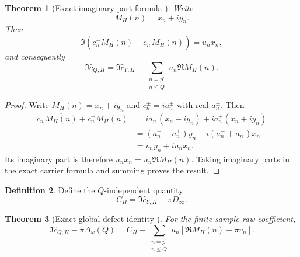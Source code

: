 \documentclass[11pt]{amsart}
\numberwithin{equation}{section}
\theoremstyle{plain}
\newtheorem{theorem}{Theorem}[section]
\theoremstyle{definition}
\newtheorem{definition}[theorem]{Definition}
\theoremstyle{remark}
\newcommand{\1}{\mathbf{1}}
\begin{document}
\begin{theorem}[Exact imaginary-part formula {}]
\label{thm:imaginary_part_identity}
Write
\begin{equation}
M_H(n)=x_n+iy_n.
\label{eq:abstract_MH_xy}
\end{equation}
Then
\begin{equation}
\Im\left(c_n^-\overline{M_H(n)}+c_n^+M_H(n)\right)
=u_nx_n,
\label{eq:abstract_mode_imaginary_projection}
\end{equation}
and consequently
\begin{equation}
\boxed{
\Im\widehat c_{Q,H}
=
\Im\widehat c_{Y,H}
-
\sum_{\substack{n=p^r\\n\leq Q}}
u_n\Re M_H(n).
}
\label{eq:abstract_imaginary_part_identity}
\end{equation}
\end{theorem}

\begin{proof}
Write \(M_H(n)=x_n+iy_n\) and \(c_n^\pm=ia_n^\pm\) with real
\(a_n^\pm\).  Then
\begin{align}
c_n^-\overline{M_H(n)}+c_n^+M_H(n)
&=
ia_n^-(x_n-iy_n)+ia_n^+(x_n+iy_n)
\label{eq:imaginary_identity_expand_one}
\\
&=
(a_n^--a_n^+)y_n
+i(a_n^-+a_n^+)x_n
\label{eq:imaginary_identity_expand_two}
\\
&=
v_ny_n+iu_nx_n.
\label{eq:imaginary_identity_expand_three}
\end{align}
Its imaginary part is therefore \(u_nx_n=u_n\Re M_H(n)\).  Taking
imaginary parts in the exact carrier formula and summing proves the result.
\end{proof}

\begin{definition}
\label{def:CH}
Define the \(Q\)-independent quantity
\begin{equation}
C_H
=
\Im\widehat c_{Y,H}-\pi D_\infty.
\label{eq:CH_definition}
\end{equation}
\end{definition}


\begin{theorem}[Exact global defect identity {}]
\label{thm:global_defect_identity}
For the finite-sample raw coefficient,
\begin{equation}
\boxed{
\Im\widehat c_{Q,H}-\pi\Delta_\omega(Q)
=
C_H
-
\sum_{\substack{n=p^r\\n\leq Q}}
u_n\left[
\Re M_H(n)-\pi v_n
\right].
}
\label{eq:global_defect_identity}
\end{equation}
\end{theorem}
\end{document}
